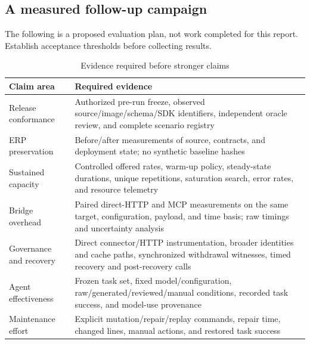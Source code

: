 \subsection*{A measured follow-up campaign}
The following is a proposed evaluation plan, not work completed for this report. Establish acceptance thresholds before collecting results.

\begin{table}[h]\caption{Evidence required before stronger claims}\EvidenceTableStart
\begin{tabularx}{\linewidth}{@{}P{32mm}X@{}}\toprule
Claim area & Required evidence\\\midrule
Release conformance & Authorized pre-run freeze, observed source/image/schema/SDK identifiers, independent oracle review, and complete scenario registry\\
ERP preservation & Before/after measurements of source, contracts, and deployment state; no synthetic baseline hashes\\
Sustained capacity & Controlled offered rates, warm-up policy, steady-state durations, unique repetitions, saturation search, error rates, and resource telemetry\\
Bridge overhead & Paired direct-HTTP and MCP measurements on the same target, configuration, payload, and time basis; raw timings and uncertainty analysis\\
Governance and recovery & Direct connector/HTTP instrumentation, broader identities and cache paths, synchronized withdrawal witnesses, timed recovery and post-recovery calls\\
Agent effectiveness & Frozen task set, fixed model/configuration, raw/generated/reviewed/manual conditions, recorded task success, and model-use provenance\\
Maintenance effort & Explicit mutation/repair/replay commands, repair time, changed lines, manual actions, and restored task success\\\bottomrule
\end{tabularx}\end{table}

